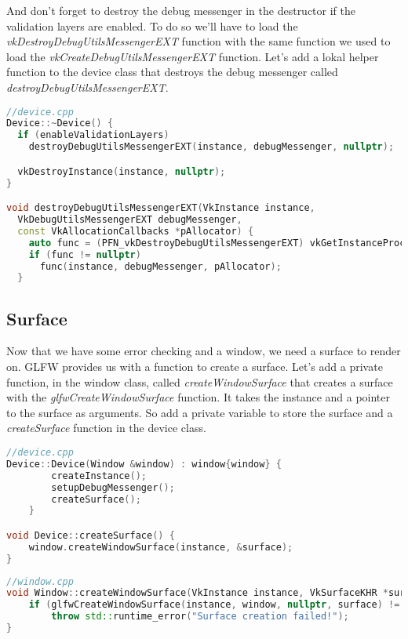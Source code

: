\documentclass[12pt]{report} \usepackage{preamble}
\begin{document}
And don't forget to destroy the debug messenger in the destructor if the validation layers are enabled.
To do so we'll have to load the \textit{vkDestroyDebugUtilsMessengerEXT} function with the same
function we used to load the \textit{vkCreateDebugUtilsMessengerEXT} function. Let's add a lokal helper function
to the device class that destroys the debug messenger called \textit{destroyDebugUtilsMessengerEXT}.

\begin{lstlisting}[language=C++]
//device.cpp
Device::~Device() {
  if (enableValidationLayers)
    destroyDebugUtilsMessengerEXT(instance, debugMessenger, nullptr);

  vkDestroyInstance(instance, nullptr);
}

void destroyDebugUtilsMessengerEXT(VkInstance instance, 
  VkDebugUtilsMessengerEXT debugMessenger, 
  const VkAllocationCallbacks *pAllocator) {
    auto func = (PFN_vkDestroyDebugUtilsMessengerEXT) vkGetInstanceProcAddr(instance, "vkDestroyDebugUtilsMessengerEXT");
    if (func != nullptr) 
      func(instance, debugMessenger, pAllocator);
  }
\end{lstlisting}

\subsection{Surface}

Now that we have some error checking and a window, we need a surface to render on.
\ac{GLFW} provides us with a function to create a surface. Let's add a private function,
in the window class, called
\textit{createWindowSurface} that creates a surface with the \textit{glfwCreateWindowSurface} function.
It takes the instance and a pointer to the surface as arguments. So add a private variable
to store the surface and a \textit{createSurface} function in the device class.

\begin{lstlisting}[language=C++]
//device.cpp
Device::Device(Window &window) : window{window} {
		createInstance();
		setupDebugMessenger();
		createSurface();
	}

void Device::createSurface() {
	window.createWindowSurface(instance, &surface);
}
\end{lstlisting}

\begin{lstlisting}[language=C++]
//window.cpp
void Window::createWindowSurface(VkInstance instance, VkSurfaceKHR *surface) {
	if (glfwCreateWindowSurface(instance, window, nullptr, surface) != VK_SUCCESS)
		throw std::runtime_error("Surface creation failed!");
}
\end{lstlisting}
\end{document}
